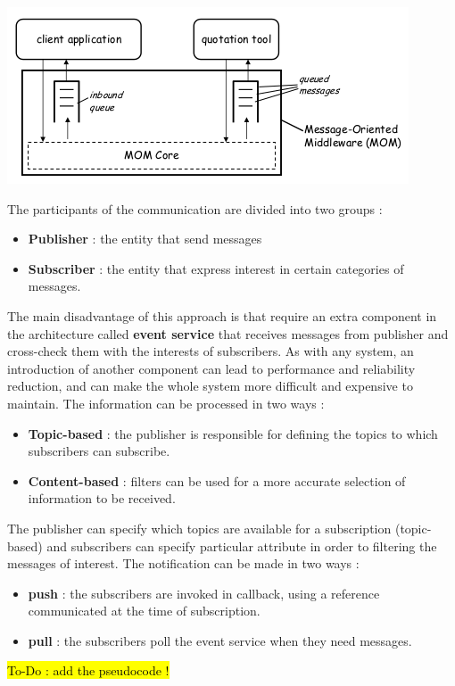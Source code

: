 \begin{center}
    \includegraphics[scale=0.55]{images/MOM_schema.png}
\end{center}
The participants of the communication are divided into two groups :
\begin{itemize}
    \item \textbf{Publisher} : the entity that send messages
    \item \textbf{Subscriber} : the entity that express interest in certain categories of messages.
\end{itemize}
The main disadvantage of this approach is that require an extra component in the architecture called \textbf{event service} that receives messages from publisher and cross-check them with the interests of subscribers. As with any system, an introduction of another component can lead to performance and reliability reduction, and can make the whole system more difficult and expensive to maintain. The information can be processed in two ways :
\begin{itemize}
    \item \textbf{Topic-based} : the publisher is responsible for defining the topics to which subscribers can subscribe.
    \item \textbf{Content-based} : filters can be used for a more accurate selection of information to be received.
\end{itemize}
The publisher can specify which topics are available for a subscription (topic-based) and subscribers can specify particular attribute in order to filtering the messages of interest.
The notification can be made in two ways :
\begin{itemize}
    \item \textbf{push} : the subscribers are invoked in callback, using a reference communicated at the time of subscription.
    \item \textbf{pull} : the subscribers poll the event service when they need messages.
\end{itemize}
\hl{To-Do : add the pseudocode !}

